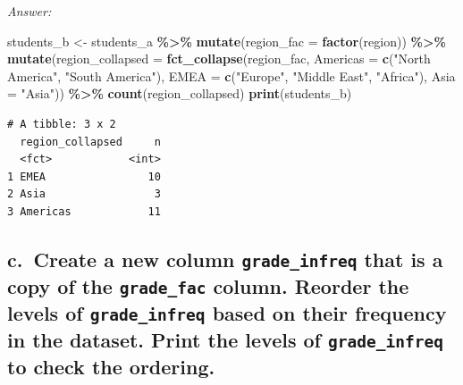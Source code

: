 \documentclass[
]{book}
\newenvironment{Shaded}{\begin{snugshade}}{\end{snugshade}}
\newcommand{\AttributeTok}[1]{\textcolor[rgb]{0.13,0.29,0.53}{#1}}
\newcommand{\FunctionTok}[1]{\textcolor[rgb]{0.13,0.29,0.53}{\textbf{#1}}}
\newcommand{\NormalTok}[1]{#1}
\newcommand{\OtherTok}[1]{\textcolor[rgb]{0.56,0.35,0.01}{#1}}
\newcommand{\SpecialCharTok}[1]{\textcolor[rgb]{0.81,0.36,0.00}{\textbf{#1}}}
\newcommand{\StringTok}[1]{\textcolor[rgb]{0.31,0.60,0.02}{#1}}
\begin{document}
\emph{Answer:}

\begin{Shaded}
\begin{Highlighting}[]
\NormalTok{students\_b }\OtherTok{\textless{}{-}}\NormalTok{ students\_a }\SpecialCharTok{\%\textgreater{}\%}
  \FunctionTok{mutate}\NormalTok{(}\AttributeTok{region\_fac =} \FunctionTok{factor}\NormalTok{(region)) }\SpecialCharTok{\%\textgreater{}\%}
  \FunctionTok{mutate}\NormalTok{(}\AttributeTok{region\_collapsed =} \FunctionTok{fct\_collapse}\NormalTok{(region\_fac, }
                                         \AttributeTok{Americas =} \FunctionTok{c}\NormalTok{(}\StringTok{"North America"}\NormalTok{, }\StringTok{"South America"}\NormalTok{), }
                                         \AttributeTok{EMEA =} \FunctionTok{c}\NormalTok{(}\StringTok{"Europe"}\NormalTok{, }\StringTok{"Middle East"}\NormalTok{, }\StringTok{"Africa"}\NormalTok{), }
                                         \AttributeTok{Asia =} \StringTok{"Asia"}\NormalTok{)) }\SpecialCharTok{\%\textgreater{}\%}
  \FunctionTok{count}\NormalTok{(region\_collapsed)}
\FunctionTok{print}\NormalTok{(students\_b)}
\end{Highlighting}
\end{Shaded}

\begin{verbatim}
# A tibble: 3 x 2
  region_collapsed     n
  <fct>            <int>
1 EMEA                10
2 Asia                 3
3 Americas            11
\end{verbatim}

\hypertarget{c.-create-a-new-column-grade_infreq-that-is-a-copy-of-the-grade_fac-column.-reorder-the-levels-of-grade_infreq-based-on-their-frequency-in-the-dataset.-print-the-levels-of-grade_infreq-to-check-the-ordering.}{%
\subsection{\texorpdfstring{c.~Create a new column \texttt{grade\_infreq} that is a copy of the \texttt{grade\_fac} column. Reorder the levels of \texttt{grade\_infreq} based on their frequency in the dataset. Print the levels of \texttt{grade\_infreq} to check the ordering.}{c.~Create a new column grade\_infreq that is a copy of the grade\_fac column. Reorder the levels of grade\_infreq based on their frequency in the dataset. Print the levels of grade\_infreq to check the ordering.}}\label{c.-create-a-new-column-grade_infreq-that-is-a-copy-of-the-grade_fac-column.-reorder-the-levels-of-grade_infreq-based-on-their-frequency-in-the-dataset.-print-the-levels-of-grade_infreq-to-check-the-ordering.}}
\end{document}
